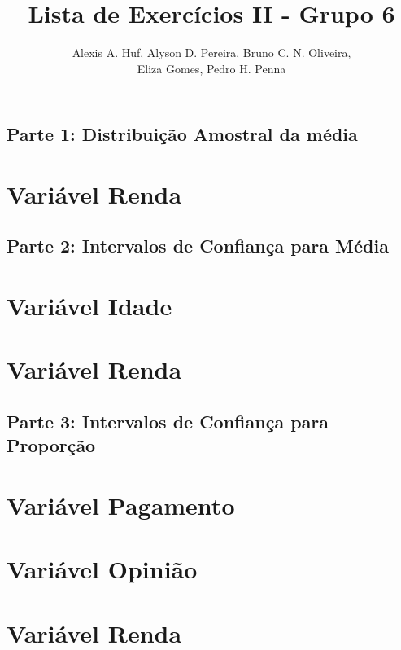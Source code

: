 \documentclass[10pt,a4paper,oneside]{article}
\author{%
	Alexis A. Huf, %
	Alyson D. Pereira, %
	Bruno C. N. Oliveira,\\%
	Eliza Gomes, %
	Pedro H. Penna
	}
\title{Lista de Exercícios II - Grupo 6}
\begin{document}
\maketitle

\begin{center}
 	\section*{Parte 1: Distribuição Amostral da média}
 \end{center}

 \section{Variável Renda}
 \label{questao:1}
 

 \begin{center}
 	\section*{Parte 2: Intervalos de Confiança para Média}
 \end{center}

\section{Variável Idade}
\label{questao:2}


 \section{Variável Renda}
 \label{questao:3}
 

 \begin{center}
 	\section*{Parte 3: Intervalos de Confiança para Proporção}
 \end{center}

 \section{Variável Pagamento}
 \label{questao:4}
 

 \section{Variável Opinião}
 \label{questao:5}
 
 
 \section{Variável Renda}
 \label{questao:6}
 
\end{document}
